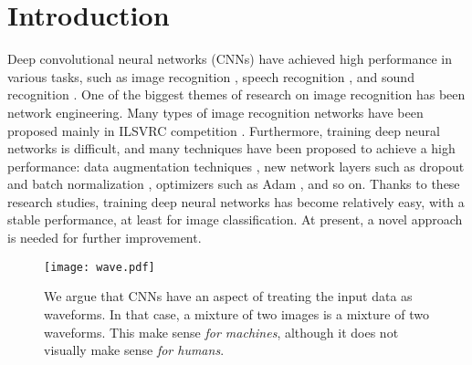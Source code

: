 \documentclass[10pt,twocolumn,letterpaper]{article}
\begin{document}

\section{Introduction}
Deep convolutional neural networks (CNNs) \cite{lecun1998gradient} have achieved high performance in various tasks, such as image recognition \cite{krizhevsky2012imagenet, he2016deep}, speech recognition \cite{abdel2014convolutional, sainath2015learning}, and sound recognition \cite{piczak2015environmental, tokozume2017learning}. One of the biggest themes of research on image recognition has been network engineering. Many types of image recognition networks have been proposed mainly in ILSVRC competition \cite{krizhevsky2012imagenet, simonyan2015very, szegedy2015going, he2016deep, xie2017aggregated, zhang2016polynet, hu2017squeeze}. Furthermore, training deep neural networks is difficult, and many techniques have been proposed to achieve a high performance: data augmentation techniques \cite{krizhevsky2012imagenet}, new network layers such as dropout \cite{srivastava2014dropout} and batch normalization \cite{ioffe2015batch}, optimizers such as Adam \cite{kingma2014adam}, and so on. Thanks to these research studies, training deep neural networks has become relatively easy, with a stable performance, at least for image classification. At present, a novel approach is needed for further improvement.

\begin{figure}
\begin{center}
	\texttt{[image: wave.pdf]}
\end{center}
\vspace{-3mm}
   \caption{We argue that CNNs have an aspect of treating the input data as waveforms. In that case, a mixture of two images is a mixture of two waveforms. This make sense {\it for machines}, although it does not visually make sense {\it for humans}.}
\label{fig:wave}
\vspace{-4mm}
\end{figure}
\end{document}
